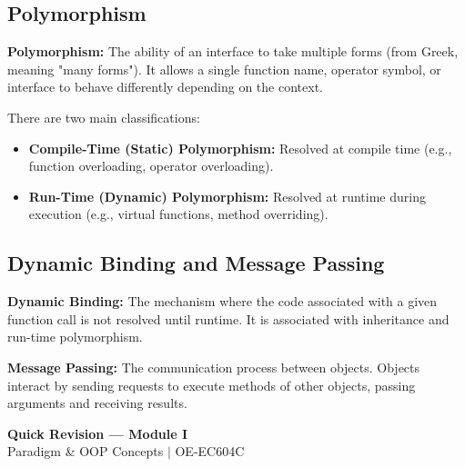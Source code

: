 \documentclass[12pt,a4paper]{article}
\begin{document}
\subsection{Polymorphism}
\begin{tcolorbox}[defbox]
\textbf{Polymorphism:} The ability of an interface to take multiple forms (from Greek, meaning "many forms"). It allows a single function name, operator symbol, or interface to behave differently depending on the context.
\end{tcolorbox}
There are two main classifications:
\begin{itemize}[leftmargin=*, itemsep=2pt]
  \item \textbf{Compile-Time (Static) Polymorphism:} Resolved at compile time (e.g., function overloading, operator overloading).
  \item \textbf{Run-Time (Dynamic) Polymorphism:} Resolved at runtime during execution (e.g., virtual functions, method overriding).
\end{itemize}

\subsection{Dynamic Binding and Message Passing}
\begin{tcolorbox}[defbox]
\textbf{Dynamic Binding:} The mechanism where the code associated with a given function call is not resolved until runtime. It is associated with inheritance and run-time polymorphism.
\par\vspace{3pt}
\textbf{Message Passing:} The communication process between objects. Objects interact by sending requests to execute methods of other objects, passing arguments and receiving results.
\end{tcolorbox}

\newpage
\begin{center}
  {\large\bfseries\color{myred} Quick Revision --- Module I}\\[3pt]
  {\small\color{mydark} Paradigm \& OOP Concepts $|$ OE-EC604C}
\end{center}
\noindent{\color{myred}\rule{\linewidth}{1.2pt}}
\vspace{4pt}
\end{document}
